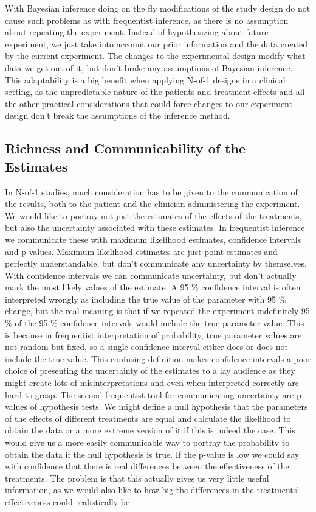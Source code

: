 \documentclass[12pt,a4paper,leqno]{report}
\theoremstyle{plain}
\theoremstyle{definition}
\theoremstyle{remark}
\begin{document}
With Bayesian inference doing on the fly modifications of the study design do not
cause such problems as with frequentist inference, as there is no assumption
about repeating the experiment. Instead of hypothesizing about future
experiment, we just take into account our prior information and the data created by
the current experiment. The changes to the experimental design modify what data
we get out of it, but don't brake any assumptions of Bayesian inference. This
adaptability is a big benefit when applying N-of-1 designs in a clinical setting, as
the unpredictable nature of the patients and treatment effects and all the other
practical considerations that could force changes to our experiment design don't
break the assumptions of the inference method.

\subsection{Richness and Communicability of the Estimates}\label{whybayes}

In N-of-1 studies, much consideration has to be given to the communication of the
results, both to the patient and the clinician administering the experiment. We
would like to portray not just the estimates of the effects of the treatments,
but also the uncertainty associated with these estimates. In frequentist
inference we communicate these with maximum likelihood estimates, confidence
intervals and p-values. Maximum likelihood estimates are just point estimates and perfectly
understandable, but don't communicate any uncertainty by themselves. With confidence
intervals we can communicate uncertainty, but don't actually mark the most likely
values of the estimate. A 95 \% confidence interval is often interpreted wrongly
as including the true value of the parameter with 95 \% change, but the real
meaning is that if we repeated the experiment indefinitely 95 \% of the
95 \% confidence intervals would include the true parameter value. This is
because in frequentist interpretation of probability, true parameter values
are not random but fixed, so a single confidence interval either does or does
not include the true value. This confusing definition makes confidence intervals
a poor choice of presenting the uncertainty of the estimates to a lay audience
as they might create lots of misinterpretations and even when interpreted correctly
are hard to grasp. The second frequentist tool for communicating uncertainty
are p-values of hypothesis tests. We might define a null hypothesis that the
parameters of the effects of different treatments are equal and calculate the
likelihood to obtain the data or a more extreme version of it if this is indeed the
case. This would give us a more easily communicable way to portray the probability
to obtain the data if the null hypothesis is true. If the p-value is low we could
say with confidence that there is real differences between the effectiveness of
the treatments. The problem is that this actually gives us very little useful
information, as we would also like to how big the differences in the treatments' effectiveness
could realistically be.
\end{document}
